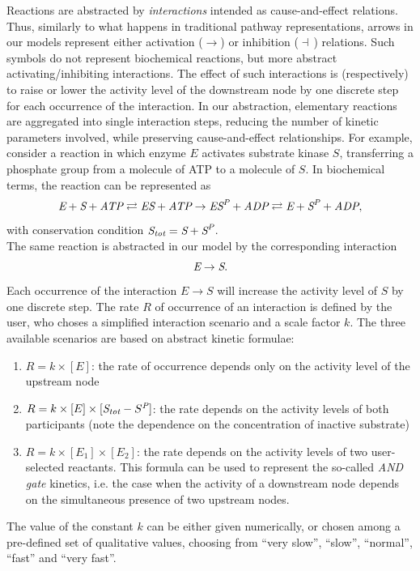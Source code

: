 Reactions are abstracted by \emph{interactions} intended as cause-and-effect relations. Thus,
similarly to what happens in traditional pathway representations, arrows in
our models represent either activation ($\rightarrow$) or inhibition ($\dashv$\,) relations.
Such symbols do not represent biochemical reactions, but more abstract activating/inhibiting interactions.
The effect of such interactions is (respectively)
to raise or lower the activity level of the downstream node by one discrete step for each occurrence of
the interaction. In our abstraction, elementary reactions are aggregated into single interaction steps,
reducing the number of kinetic parameters involved, while preserving cause-and-effect relationships.
For example, consider a reaction in which enzyme $E$ activates substrate kinase $S$, transferring
a phosphate group from a molecule of ATP to a molecule of $S$. In biochemical
terms, the reaction can be represented as
$$
\mbox{\it E} + \mbox{\it S} + \mbox{\it ATP} \rightleftarrows \mbox{\it ES} + \mbox{\it ATP} \rightarrow \mbox{\it ES}^{\mbox{\scriptsize \it P}} + \mbox{\it ADP} \rightleftarrows \mbox{\it E} + \mbox{\it S}^{\mbox{\scriptsize\it P}} + \mbox{\it ADP},
$$
with conservation condition $\mbox{\it S}_{\mbox{\scriptsize\it tot}} = \mbox{\it S} + \mbox{\it S}^{\mbox{\scriptsize\it P}}$.\\
The same reaction is abstracted in our model by the corresponding interaction
$$
\mbox{\it E} \rightarrow \mbox{\it S}.
$$
Each occurrence of the interaction $E \rightarrow S$ will increase the activity level of $S$ by one discrete step.
The rate $R$ of occurrence of an interaction is defined by the user, who choses a simplified interaction scenario
and a scale factor $k$.
The three available scenarios are based on abstract kinetic formulae:
\begin{enumerate}
  \item $R = k \times [E]$: the rate of occurrence depends only on the activity level of the upstream node
  \item $R = k \times [E] \times [\mbox{\it S}_{\mbox{\scriptsize\it tot}} - S^{\mbox{\scriptsize\it P}}]$: the rate depends on the activity levels of both participants
(note the dependence on the concentration of inactive substrate)
  \item $R = k \times [E_1] \times [E_2]$: the rate depends on the activity levels of two user-selected reactants.
This formula can be used to represent the so-called
\emph{AND gate} kinetics, i.e. the case when the activity of a downstream node depends on the
simultaneous presence of two upstream nodes.
\end{enumerate}
The value of the constant $k$ can be either given numerically, or chosen among a pre-defined set of
qualitative values, choosing from ``very slow'', ``slow'', ``normal'', ``fast'' and ``very fast''.

